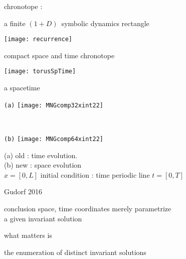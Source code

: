 \begin{frame}{chronotope : }

a finite $(1+D)$\dmn\ symbolic dynamics rectangle

\begin{center}
\texttt{[image: recurrence]}
\end{center}
\hfill \color{red}{make it doubly periodic}
\end{frame}

\begin{frame}{compact space and time chronotope}
\begin{center}
\texttt{[image: torusSpTime]}
\end{center}
\end{frame}

\begin{frame}{a spacetime {\twot}
}
\begin{center}
  \begin{minipage}[height=.40\textheight]{.35\textwidth}
    \centering \small{\texttt{(a)}}
    \texttt{[image: MNGcomp32xint22]}
  \end{minipage}
~~~~~~~~~
  \begin{minipage}[height=.40\textheight]{.35\textwidth}
    \centering \small{\texttt{(b)}}
    \texttt{[image: MNGcomp64xint22]}
  \end{minipage}
\end{center}
    (a) old : time evolution.
\\
    (b) new : space evolution
    \\
    $x=[0,L]$ %
       initial condition : time periodic line $t = [0,T]$

\vfill\hfill        Gudorf 2016
\end{frame}



\begin{frame}{conclusion}
space, time coordinates merely parametrize
\\
a given invariant solution

\bigskip

what matters is

\vfill

{\Large
the enumeration of distinct invariant solutions
                  }
\end{frame}

